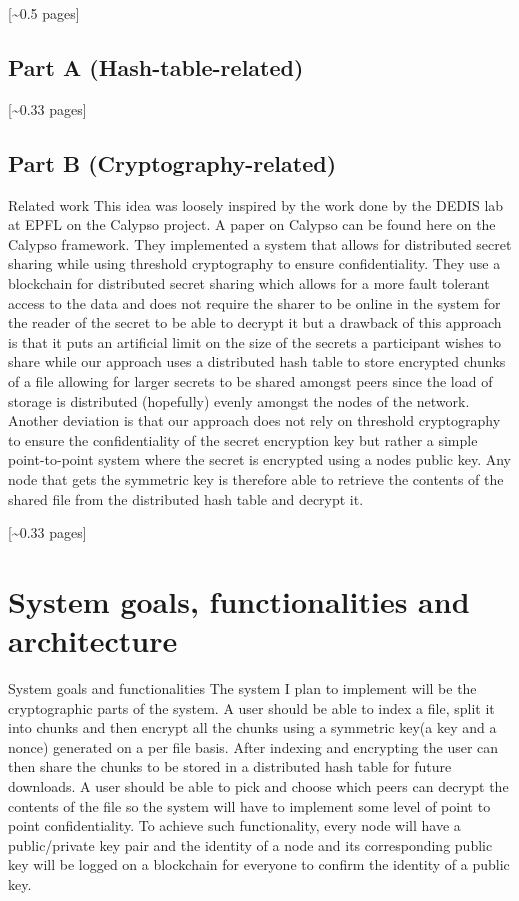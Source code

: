 \documentclass[12pt,a4paper,draft]{article}
\begin{document}
[\textasciitilde{}0.5 pages]

\subsection{Part A (Hash-table-related)}

[\textasciitilde{}0.33 pages]

\subsection{Part B (Cryptography-related)}
Related work
This idea was loosely inspired by the work done by the DEDIS lab at EPFL on the Calypso project. A paper on Calypso can be found here on the Calypso framework. They implemented a system that allows for distributed secret sharing while using threshold cryptography to ensure confidentiality. They use a blockchain for distributed secret sharing which allows for a more fault tolerant access to the data and does not require the sharer to be online in the system for the reader of the secret to be able to decrypt it but a drawback of this approach is that it puts an artificial limit on the size of the secrets a participant wishes to share while our approach uses a distributed hash table to store encrypted chunks of a file allowing for larger secrets to be shared amongst peers since the load of storage is distributed (hopefully) evenly amongst the nodes of the network. Another deviation is that our approach does not rely on threshold cryptography to ensure the confidentiality of the secret encryption key but rather a simple point-to-point system where the secret is encrypted using a nodes public key. Any node that gets the symmetric key is therefore able to retrieve the contents of the shared file from the distributed hash table and decrypt it.  

[\textasciitilde{}0.33 pages]


\section{System goals, functionalities and architecture}

System goals and functionalities
The system I plan to implement will be the cryptographic parts of the system. A user should be able to index a file, split it into chunks and then encrypt all the chunks using a symmetric key(a key and a nonce) generated on a per file basis. After indexing and encrypting the user can then share the chunks to be stored in a distributed hash table for future downloads. A user should be able to pick and choose which peers can decrypt the contents of the file so the system will have to implement some level of point to point confidentiality. To achieve such functionality, every node will have a public/private key pair and the identity of a node and its corresponding public key will be logged on a blockchain for everyone to confirm the identity of a public key.  
\end{document}
